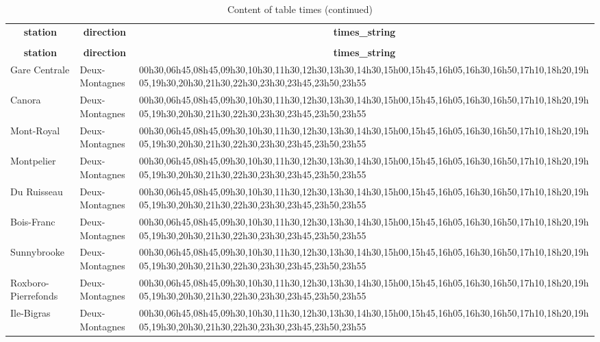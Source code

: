 %
%
 \begin{longtable}{|l|l|l|} 
 \hline \endhead \hline \endfoot \hline 
 \caption{Content of table times} \label{tab:times-data} \\\hline \multicolumn{1}{|c|}{\textbf{station}} & \multicolumn{1}{|c|}{\textbf{direction}} & \multicolumn{1}{|c|}{\textbf{times\_string}} \\ \hline \hline  \endfirsthead 
\caption{Content of table times (continued)} \\ \hline \multicolumn{1}{|c|}{\textbf{station}} & \multicolumn{1}{|c|}{\textbf{direction}} & \multicolumn{1}{|c|}{\textbf{times\_string}} \\ \hline \hline \endhead \endfoot
Gare Centrale & Deux-Montagnes & 00h30,06h45,08h45,09h30,10h30,11h30,12h30,13h30,14h30,15h00,15h45,16h05,16h30,16h50,17h10,18h20,19h05,19h30,20h30,21h30,22h30,23h30,23h45,23h50,23h55 \\ \hline 
Canora & Deux-Montagnes & 00h30,06h45,08h45,09h30,10h30,11h30,12h30,13h30,14h30,15h00,15h45,16h05,16h30,16h50,17h10,18h20,19h05,19h30,20h30,21h30,22h30,23h30,23h45,23h50,23h55 \\ \hline 
Mont-Royal & Deux-Montagnes & 00h30,06h45,08h45,09h30,10h30,11h30,12h30,13h30,14h30,15h00,15h45,16h05,16h30,16h50,17h10,18h20,19h05,19h30,20h30,21h30,22h30,23h30,23h45,23h50,23h55 \\ \hline 
Montpelier & Deux-Montagnes & 00h30,06h45,08h45,09h30,10h30,11h30,12h30,13h30,14h30,15h00,15h45,16h05,16h30,16h50,17h10,18h20,19h05,19h30,20h30,21h30,22h30,23h30,23h45,23h50,23h55 \\ \hline 
Du Ruisseau & Deux-Montagnes & 00h30,06h45,08h45,09h30,10h30,11h30,12h30,13h30,14h30,15h00,15h45,16h05,16h30,16h50,17h10,18h20,19h05,19h30,20h30,21h30,22h30,23h30,23h45,23h50,23h55 \\ \hline 
Bois-Franc & Deux-Montagnes & 00h30,06h45,08h45,09h30,10h30,11h30,12h30,13h30,14h30,15h00,15h45,16h05,16h30,16h50,17h10,18h20,19h05,19h30,20h30,21h30,22h30,23h30,23h45,23h50,23h55 \\ \hline 
Sunnybrooke & Deux-Montagnes & 00h30,06h45,08h45,09h30,10h30,11h30,12h30,13h30,14h30,15h00,15h45,16h05,16h30,16h50,17h10,18h20,19h05,19h30,20h30,21h30,22h30,23h30,23h45,23h50,23h55 \\ \hline 
Roxboro-Pierrefonds & Deux-Montagnes & 00h30,06h45,08h45,09h30,10h30,11h30,12h30,13h30,14h30,15h00,15h45,16h05,16h30,16h50,17h10,18h20,19h05,19h30,20h30,21h30,22h30,23h30,23h45,23h50,23h55 \\ \hline 
Ile-Bigras & Deux-Montagnes & 00h30,06h45,08h45,09h30,10h30,11h30,12h30,13h30,14h30,15h00,15h45,16h05,16h30,16h50,17h10,18h20,19h05,19h30,20h30,21h30,22h30,23h30,23h45,23h50,23h55 \\ \hline 

\end{longtable}
